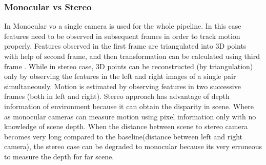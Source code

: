 \subsubsection{Monocular vs Stereo}
In Monocular \acrshort{vo} a single camera is used for the whole pipeline. In this case features need to be observed in subsequent frames in order to track motion properly. Features observed in the first frame are triangulated into 3D points with help of second frame, and then transformation can be calculated using third frame \cite{KhalidYousif-et-al-2015}. While in stereo case, 3D points can be reconstructed (by triangulation) only by observing the features in the left and right images of a single pair simultaneously. Motion is estimated by observing features in two successive frames (both in left and right). Stereo approach has advantage of depth information of environment because it can obtain the disparity in scene. Where as monocular cameras can measure motion using pixel information only with no knowledge of scene depth. When the distance between scene to stereo camera becomes very long compared to the baseline(distance between left and right camera), the stereo case can be degraded to monocular because its very erroneous to measure the depth for far scene. 

